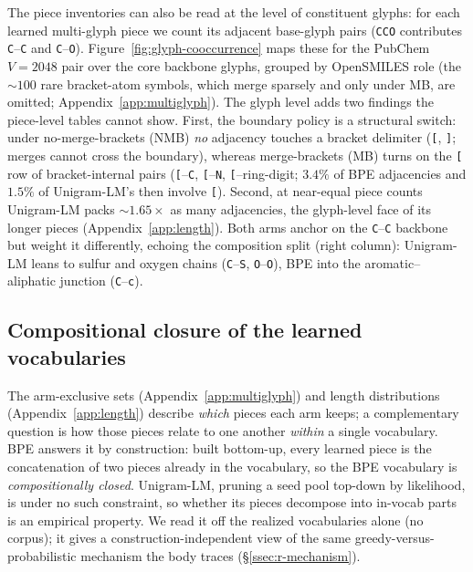\documentclass{article}
\begin{document}
The piece inventories can also be read at the level of constituent glyphs: for
each learned multi-glyph piece we count its adjacent base-glyph pairs
(\texttt{CCO} contributes \texttt{C}--\texttt{C} and \texttt{C}--\texttt{O}).
Figure~\ref{fig:glyph-cooccurrence} maps these for the PubChem $V{=}2048$ pair
over the core backbone glyphs, grouped by OpenSMILES role (the $\sim$$100$ rare
bracket-atom symbols, which merge sparsely and only under MB, are omitted;
Appendix~\ref{app:multiglyph}). The glyph level adds two findings the piece-level
tables cannot show. First, the boundary policy is a structural switch: under
no-merge-brackets (NMB) \emph{no} adjacency touches a bracket delimiter
(\texttt{[}, \texttt{]}; merges cannot cross the boundary), whereas merge-brackets
(MB) turns on the \texttt{[} row of bracket-internal pairs (\texttt{[}--\texttt{C},
\texttt{[}--\texttt{N}, \texttt{[}--ring-digit; $3.4\%$ of BPE adjacencies and
$1.5\%$ of Unigram-LM's then involve \texttt{[}). Second, at near-equal piece
counts Unigram-LM packs $\sim$$1.65\times$ as many adjacencies, the glyph-level
face of its longer pieces (Appendix~\ref{app:length}). Both arms anchor on the
\texttt{C}--\texttt{C} backbone but weight it differently, echoing the composition
split (right column): Unigram-LM leans to sulfur and oxygen chains
(\texttt{C}--\texttt{S}, \texttt{O}--\texttt{O}), BPE into the aromatic--aliphatic
junction (\texttt{C}--\texttt{c}).

\subsection{Compositional closure of the learned vocabularies}\label{app:closure}



The arm-exclusive sets (Appendix~\ref{app:multiglyph}) and length distributions
(Appendix~\ref{app:length}) describe \emph{which} pieces each arm keeps; a complementary
question is how those pieces relate to one another \emph{within} a single
vocabulary. BPE answers it by construction: built bottom-up, every learned piece
is the concatenation of two pieces already in the vocabulary, so the BPE
vocabulary is \emph{compositionally closed}. Unigram-LM, pruning a seed pool
top-down by likelihood, is under no such constraint, so whether its pieces
decompose into in-vocab parts is an empirical property. We read it off the
realized vocabularies alone (no corpus); it gives a construction-independent
view of the same greedy-versus-probabilistic mechanism the body traces
(\S\ref{ssec:r-mechanism}).
\end{document}
